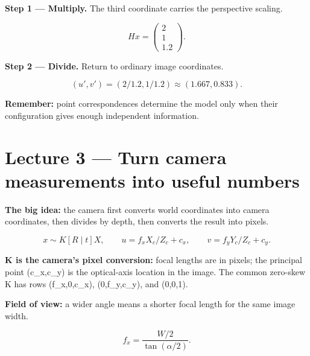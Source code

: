 \documentclass[11pt,letterpaper]{article}
\begin{document}
\textcolor{StepRed}{\textbf{Step 1 — Multiply.} The third coordinate carries the perspective scaling.}



\begin{tcolorbox}\color{MathBlue}\[Hx=\begin{pmatrix}2\\1\\1.2\end{pmatrix}.\]\end{tcolorbox}


\textcolor{StepRed}{\textbf{Step 2 — Divide.} Return to ordinary image coordinates.}



\begin{tcolorbox}\color{MathBlue}\[(u',v')=(2/1.2,1/1.2)\approx(1.667,0.833).\]\end{tcolorbox}


\textbf{Remember:} point correspondences determine the model only when their configuration gives enough independent information.



\section*{Lecture 3 — Turn camera measurements into useful numbers}


\textbf{The big idea:} the camera first converts world coordinates into camera coordinates, then divides by depth, then converts the result into pixels.



\begin{tcolorbox}\color{MathBlue}\[x\sim K[R\mid t]X, \qquad u=f_xX_c/Z_c+c_x, \qquad v=f_yY_c/Z_c+c_y.\]\end{tcolorbox}


\textbf{K is the camera's pixel conversion:} focal lengths are in pixels; the principal point (c\_x,c\_y) is the optical-axis location in the image. The common zero-skew K has rows (f\_x,0,c\_x), (0,f\_y,c\_y), and (0,0,1).



\textbf{Field of view:} a wider angle means a shorter focal length for the same image width.



\begin{tcolorbox}\color{MathBlue}\[f_x=\frac{W/2}{\tan(\alpha/2)}.\]\end{tcolorbox}
\end{document}
